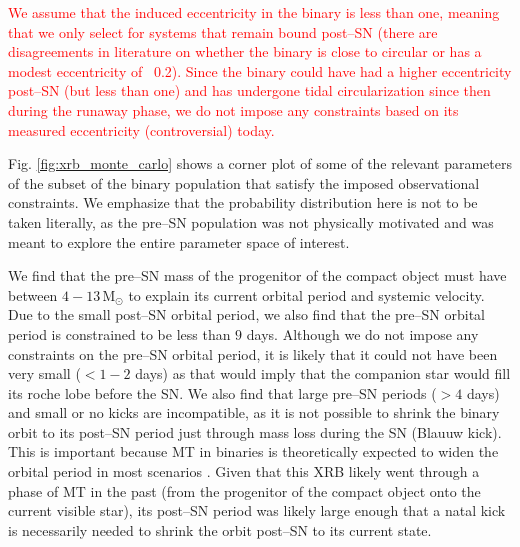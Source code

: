 \documentclass[linenumbers,trackchanges,twocolumn]{aastex701}
\newcommand{\Mdot}{\mathrm{M}_{\odot}}
\newcommand{\red}{\textcolor{red}}
\begin{document}
\red{We assume that the induced eccentricity in the binary is less than one, meaning that we only select for systems that remain bound post--SN (there are disagreements in literature on whether the binary is close to circular or has a modest eccentricity of ~0.2). Since the binary could have had a higher eccentricity post--SN (but less than one) and has undergone tidal circularization since then during the runaway phase, we do not impose any constraints based on its measured eccentricity (controversial) today.}

Fig. \ref{fig:xrb_monte_carlo} shows a corner plot of some of the relevant parameters of the subset of the binary population that satisfy the imposed observational constraints. We emphasize that the probability distribution here is not to be taken literally, as the pre--SN population was not physically motivated and was meant to explore the entire parameter space of interest.

We find that the pre--SN mass of the progenitor of the compact object must have between $4-13\,\Mdot$ to explain its current orbital period and systemic velocity. Due to the small post--SN orbital period, we also find that the pre--SN orbital period is constrained to be less than $9$ days. Although we do not impose any constraints on the pre--SN orbital period, it is likely that it could not have been very small ($<1-2$ days) as that would imply that the companion star would fill its roche lobe before the SN. We also find that large pre--SN periods ($>4$ days) and small or no kicks are incompatible, as it is not possible to shrink the binary orbit to its post--SN period just through mass loss during the SN (Blauuw kick). This is important because MT in binaries is theoretically expected to widen the orbital period in most scenarios \citep{2019A&A...624A..66R}. Given that this XRB likely went through a phase of MT in the past (from the progenitor of the compact object onto the current visible star), its post--SN period was likely large enough that a natal kick is necessarily needed to shrink the orbit post--SN to its current state. 
\end{document}

